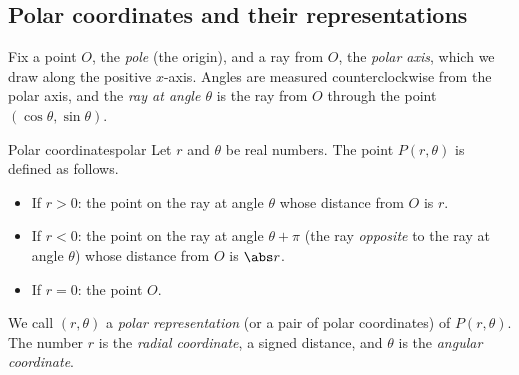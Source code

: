 \documentclass[11pt]{article}
\begin{document}
\subsection*{Polar coordinates and their representations}

Fix a point $O$, the \emph{pole} (the origin), and a ray from $O$, the \emph{polar axis}, which we draw along the positive $x$-axis. Angles are measured counterclockwise from the polar axis, and the \emph{ray at angle $\theta$} is the ray from $O$ through the point $(\cos\theta,\sin\theta)$.

\begin{defn}{Polar coordinates}{polar}
Let $r$ and $\theta$ be real numbers. The point $P(r,\theta)$ is defined as follows.
\begin{itemize}[nosep]
  \item If $r>0$: the point on the ray at angle $\theta$ whose distance from $O$ is $r$.
  \item If $r<0$: the point on the ray at angle $\theta+\pi$ (the ray \emph{opposite} to the ray at angle $\theta$) whose distance from $O$ is $\abs r$.
  \item If $r=0$: the point $O$.
\end{itemize}
We call $(r,\theta)$ a \emph{polar representation} (or a pair of polar coordinates) of $P(r,\theta)$. The number $r$ is the \emph{radial coordinate}, a signed distance, and $\theta$ is the \emph{angular coordinate}.
\end{defn}

\begin{center}
\end{center}
\end{document}
